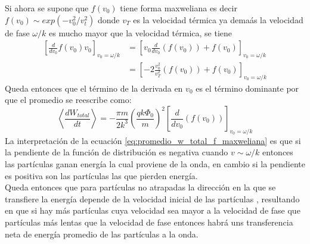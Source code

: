 \documentclass[../tesis_main_file.tex]{subfiles}
\begin{document}
Si ahora se supone que $f(v_0)$ tiene forma maxweliana es decir $f(v_0)\sim exp(-v_0^2/v_t^2)$ donde $v_T$ es la velocidad térmica ya demaás la velocidad de fase $\omega /k$ es mucho mayor que la velocidad térmica, se tiene
\begin{align}
\left[\frac{d}{dv_0}f(v_0)v_0\right]_{v_0=\omega /k} &= \left[v_0 \frac{d}{dv_0}(f(v_0))+f(v_0)\right]_{v_0=\omega /k}\\
&=\left[-2 \frac{v_0^2}{v_T^2}(f(v_0))+f(v_0)\right]_{v_0=\omega /k}
\end{align}
Queda entonces que el término de la derivada en $v_0$ es el término dominante por que el promedio se reescribe como:
\begin{equation}
\label{eq:promedio_w_total_f_maxweliana}
\left\langle \frac{dW_{total}}{dt}\right\rangle=-\frac{\pi m}{2k^3}\left(\frac{qk\Phi_0}{m}\right)^2\left[\frac{d}{dv_0}(f(v_0))\right]_{v_0=\omega /k}
\end{equation}
La interpretación de la ecuación \ref{eq:promedio_w_total_f_maxweliana} es que si la pendiente de la función de distribución es negativa cuando $v\sim \omega /k$ entonces las partículas ganan energía la cual proviene de la onda, en cambio si la pendiente es positiva son las partículas las que pierden energía.\\
Queda entonces que para partículas no atrapadas la dirección en la que se transfiere la energía depende de la velocidad inicial de las partículas , resultando en que si hay más partículas cuya velocidad sea mayor a la velocidad de fase que partículas más lentas que la velocidad de fase entonces habrá uns transferencia neta de energía promedio de las partículas a la onda.
\end{document}
